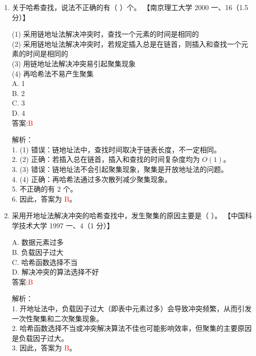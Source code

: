 \documentclass[lang=cn,newtx,10pt,scheme=chinese]{../../../elegantbook}
\begin{document}
\begin{enumerate}
\item 关于哈希查找，说法不正确的有（ ）个。  
    【南京理工大学 2000 一、16（1.5 分）】  

    (1) 采用链地址法解决冲突时，查找一个元素的时间是相同的 \\  
    (2) 采用链地址法解决冲突时，若规定插入总是在链首，则插入和查找一个元素的时间是相同的 \\  
    (3) 用链地址法解决冲突易引起聚集现象 \\  
    (4) 再哈希法不易产生聚集 \\  

    A. 1 \\  
    B. 2 \\  
    C. 3 \\  
    D. 4 \\  

    答案:\textcolor{red}{B}

    解析：\\
    1. (1) 错误：链地址法中，查找时间取决于链表长度，不一定相同。\\
    2. (2) 正确：若插入总在链首，插入和查找的时间复杂度均为 $O(1)$。\\
    3. (3) 错误：链地址法不会引起聚集现象，聚集是开放地址法的问题。\\
    4. (4) 正确：再哈希法通过多次散列减少聚集现象。\\
    5. 不正确的有 2 个。\\
    6. 因此，答案为 \textcolor{red}{B}。\\

    \item 采用开地址法解决冲突的哈希查找中，发生聚集的原因主要是（ ）。  
    【中国科学技术大学 1997 一、4（1 分）】  

    A. 数据元素过多 \\  
    B. 负载因子过大 \\  
    C. 哈希函数选择不当 \\  
    D. 解决冲突的算法选择不好 \\  

    答案:\textcolor{red}{B}

    解析：\\
    1. 开地址法中，负载因子过大（即表中元素过多）会导致冲突频繁，从而引发一次性聚集和二次聚集现象。\\
    2. 哈希函数选择不当或冲突解决算法不佳也可能影响效率，但聚集的主要原因是负载因子过大。\\
    3. 因此，答案为 \textcolor{red}{B}。\\


\end{enumerate}
\end{document}
